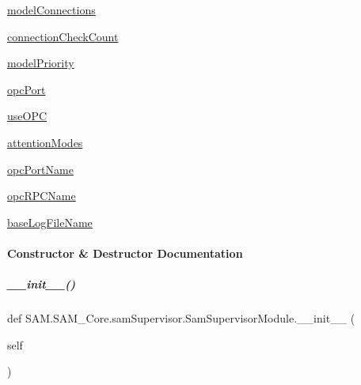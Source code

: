 \begin{DoxyCompactItemize}
\item 
\hyperlink{group__icubclient__SAM__Core_a8f05cbca7d27bf454b60737d1d30bae2}{model\+Connections}
\item 
\hyperlink{group__icubclient__SAM__Core_a6b8a03c255d706659b277b85f457ad10}{connection\+Check\+Count}
\item 
\hyperlink{group__icubclient__SAM__Core_ad81aabf4db53e3904bcfc01e6f4c8c61}{model\+Priority}
\item 
\hyperlink{group__icubclient__SAM__Core_a99268dc6424f48bf052b67615d39a0a4}{opc\+Port}
\item 
\hyperlink{group__icubclient__SAM__Core_af599584b52009f958c9428a0687bb32f}{use\+O\+PC}
\item 
\hyperlink{group__icubclient__SAM__Core_adb537d5404aea520fc27682dbfa784af}{attention\+Modes}
\item 
\hyperlink{group__icubclient__SAM__Core_aa851bb956869583b6c40509d8e68bcef}{opc\+Port\+Name}
\item 
\hyperlink{group__icubclient__SAM__Core_a4cd07b26f06ed9945d9370b78a9ce08e}{opc\+R\+P\+C\+Name}
\item 
\hyperlink{group__icubclient__SAM__Core_a886f293f89046a9a1bc02d87c5737385}{base\+Log\+File\+Name}
\end{DoxyCompactItemize}


\paragraph{Constructor \& Destructor Documentation}
\mbox{\label{group__icubclient__SAM__Core_a4133a020401ec002c61a3b57cd84de5d}} 
\subparagraph{\texorpdfstring{\+\_\+\+\_\+init\+\_\+\+\_\+()}{\_\_init\_\_()}}
{\footnotesize\ttfamily def S\+A\+M.\+S\+A\+M\+\_\+\+Core.\+sam\+Supervisor.\+Sam\+Supervisor\+Module.\+\_\+\+\_\+init\+\_\+\+\_\+ (\begin{DoxyParamCaption}\item[{}]{self }\end{DoxyParamCaption})}



